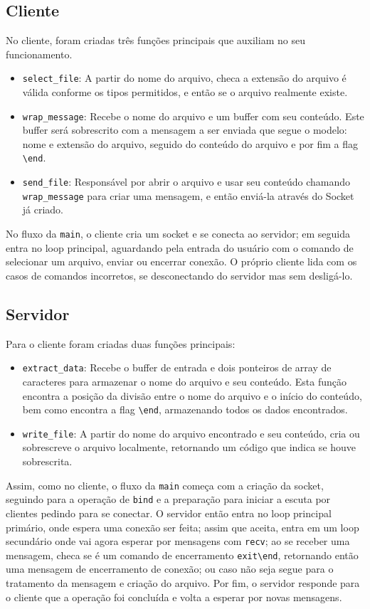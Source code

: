 \documentclass[a4paper]{article}
\begin{document}
\subsection{Cliente}
No cliente, foram criadas três funções principais que auxiliam no seu funcionamento.
\begin{itemize}
  \item \texttt{select\_file}: A partir do nome do arquivo, checa a extensão do arquivo é válida conforme os tipos permitidos, e então se o arquivo realmente existe.
  \item \texttt{wrap\_message}: Recebe o nome do arquivo e um buffer com seu conteúdo. Este buffer será sobrescrito com a mensagem a ser enviada que segue o modelo: nome e extensão do arquivo, seguido do conteúdo do arquivo e por fim a flag \texttt{\textbackslash end}.

  \item \texttt{send\_file}: Responsável por abrir o arquivo e usar seu conteúdo chamando \texttt{wrap\_message} para criar uma mensagem, e então enviá-la através do Socket já criado.
\end{itemize}

No fluxo da \texttt{main}, o cliente cria um socket e se conecta ao servidor; em seguida entra no loop principal, aguardando pela entrada do usuário com o comando de selecionar um arquivo, enviar ou encerrar conexão. O próprio cliente lida com os casos de comandos incorretos, se desconectando do servidor mas sem desligá-lo.

\subsection{Servidor}
Para o cliente foram criadas duas funções principais:
\begin{itemize}
  \item \texttt{extract\_data}: Recebe o buffer de entrada e dois ponteiros de array  de caracteres para armazenar o nome do arquivo e seu conteúdo. Esta função encontra a posição da divisão entre o nome do arquivo e o início do conteúdo, bem como encontra a flag \texttt{\textbackslash end}, armazenando todos os dados encontrados.
  \item \texttt{write\_file}: A partir do nome do arquivo encontrado e seu conteúdo, cria ou sobrescreve o arquivo localmente, retornando um código que indica se houve sobrescrita.
\end{itemize}

Assim, como no cliente, o fluxo da \texttt{main} começa com a criação da socket, seguindo para a operação de \texttt{bind} e a preparação para iniciar a escuta por clientes pedindo para se conectar. O servidor então entra no loop principal primário, onde espera uma conexão ser feita; assim que aceita, entra em um loop secundário onde vai agora esperar por mensagens com \texttt{recv}; ao se receber uma mensagem, checa se é um comando de encerramento \texttt{exit\textbackslash end}, retornando então uma mensagem de encerramento de conexão; ou caso não seja segue para o tratamento da mensagem e criação do arquivo. Por fim, o servidor responde para o cliente que a operação foi concluída e volta a esperar por novas mensagens.
\linebreak
\end{document}
